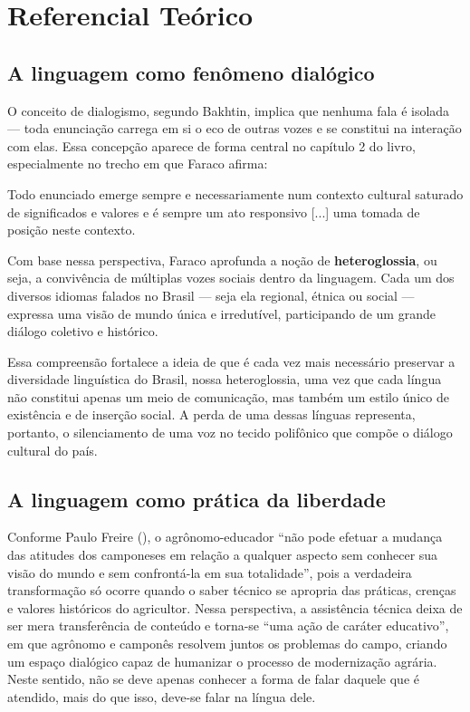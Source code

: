 \chapter{Referencial Teórico}

\section{A linguagem como fenômeno dialógico}
O conceito de dialogismo, segundo Bakhtin, implica que nenhuma fala é isolada — toda enunciação carrega em si o eco de outras vozes e se constitui na interação com elas. Essa concepção aparece de forma central no capítulo 2 do livro, especialmente no trecho em que Faraco afirma:

\begin{citacao}
Todo enunciado emerge sempre e necessariamente num contexto cultural saturado de significados e valores e é sempre um ato responsivo [...] uma tomada de posição neste contexto.
\cite{faraco2009}
\end{citacao}

Com base nessa perspectiva, Faraco aprofunda a noção de \textbf{heteroglossia}, ou seja, a convivência de múltiplas vozes sociais dentro da linguagem. Cada um dos diversos idiomas falados no Brasil — seja ela regional, étnica ou social — expressa uma visão de mundo única e irredutível, participando de um grande diálogo coletivo e histórico.

Essa compreensão fortalece a ideia de que é cada vez mais necessário preservar a diversidade linguística do Brasil, nossa heteroglossia, uma vez que cada língua não constitui apenas um meio de comunicação, mas também um estilo único de existência e de inserção social. A perda de uma dessas línguas representa, portanto, o silenciamento de uma voz no tecido polifônico que compõe o diálogo cultural do país.





\section{A linguagem como prática da liberdade}

Conforme Paulo Freire (\citeyear{freire2013extensao}), o agrônomo-educador “não pode efetuar a mudança das atitudes dos camponeses em relação a qualquer aspecto sem conhecer sua visão do mundo e sem confrontá-la em sua totalidade”, pois a verdadeira transformação só ocorre quando o saber técnico se apropria das práticas, crenças e valores históricos do agricultor. Nessa perspectiva, a assistência técnica deixa de ser mera transferência de conteúdo e torna-se “uma ação de caráter educativo”, em que agrônomo e camponês resolvem juntos os problemas do campo, criando um espaço dialógico capaz de humanizar o processo de modernização agrária.
Neste sentido, não se deve apenas conhecer a forma de falar daquele que é atendido, mais do que isso, deve-se falar na língua dele.


